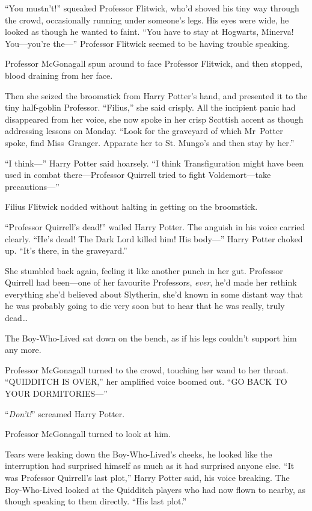 “You mustn’t!” squeaked Professor Flitwick, who’d shoved his tiny way through
the crowd, occasionally running under someone’s legs. His eyes were wide, he
looked as though he wanted to faint. “You have to stay at Hogwarts, Minerva!
You—you’re the—” Professor Flitwick seemed to be having trouble speaking.

Professor McGonagall spun around to face Professor Flitwick, and then stopped,
blood draining from her face.

Then she seized the broomstick from Harry Potter’s hand, and presented it to
the tiny half-goblin Professor. “Filius,” she said crisply. All the incipient
panic had disappeared from her voice, she now spoke in her crisp Scottish
accent as though addressing lessons on Monday. “Look for the graveyard of which
Mr~Potter spoke, find Miss~Granger. Apparate her to St. Mungo’s and then stay
by her.”

“I think—” Harry Potter said hoarsely. “I think Transfiguration might have
been used in combat there—Professor Quirrell tried to fight Voldemort—take
precautions—”

Filius Flitwick nodded without halting in getting on the broomstick.

“Professor Quirrell’s dead!” wailed Harry Potter. The anguish in his voice
carried clearly. “He’s dead! The Dark Lord killed him! His body—” Harry
Potter choked up. “It’s there, in the graveyard.”

She stumbled back again, feeling it like another punch in her gut. Professor
Quirrell had been—one of her favourite Professors, \emph{ever}, he’d made her
rethink everything she’d believed about Slytherin, she’d known in some distant
way that he was probably going to die very soon but to hear that he was really,
truly dead…

The Boy-Who-Lived sat down on the bench, as if his legs couldn’t support him
any more.

Professor McGonagall turned to the crowd, touching her wand to her throat.
“QUIDDITCH IS OVER,” her amplified voice boomed out. “GO BACK TO YOUR
DORMITORIES—”

“\emph{Don’t!}” screamed Harry Potter.

Professor McGonagall turned to look at him.

Tears were leaking down the Boy-Who-Lived’s cheeks, he looked like the
interruption had surprised himself as much as it had surprised anyone else. “It
was Professor Quirrell’s last plot,” Harry Potter said, his voice breaking. The
Boy-Who-Lived looked at the Quidditch players who had now flown to nearby, as
though speaking to them directly. “His last plot.”

